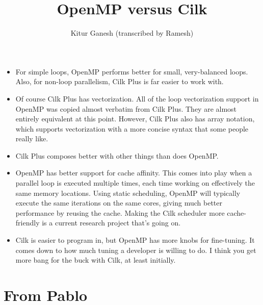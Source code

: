\documentclass[12pt]{article}
\title{OpenMP versus Cilk}
\author{Kitur Ganesh (transcribed by Ramesh)}
\begin{document}
\maketitle

\begin{itemize}
\item 
For simple loops, OpenMP performs better for small, very-balanced loops.  Also, for non-loop parallelism, Cilk Plus is far easier to work with.

\item Of course Cilk Plus has vectorization.  All of the loop vectorization support in OpenMP was copied almost verbatim from Cilk Plus.  They are almost entirely equivalent at this point.  However, Cilk Plus also has array notation, which supports vectorization with a  more concise syntax that some people really like.

\item Cilk Plus composes better with other things than does OpenMP.

\item OpenMP has better support for cache affinity.  This comes into play when a parallel loop is executed multiple times, each time working on effectively the same memory locations.  Using static scheduling, OpenMP will typically execute the same iterations on the same cores, giving much better performance by reusing the cache.  Making the Cilk scheduler more cache-friendly is a current research project that's going on. 

\item Cilk is easier to program in, but OpenMP has more knobs for fine-tuning. It comes down to how much tuning a developer is willing to do.  I think you get more bang for the buck with Cilk, at least initially.  

\end{itemize} 

\section{From Pablo}
\end{document}
